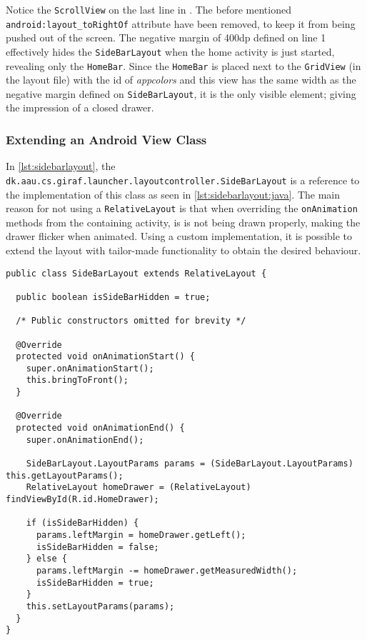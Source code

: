 Notice the \lstinline|ScrollView| on the last line in .
The before mentioned \lstinline{android:layout_toRightOf} attribute have been removed, to keep it from being pushed out of the screen.
The negative margin of 400dp defined on line 1 effectively hides the \lstinline|SideBarLayout| when the home activity is just started, revealing only the \lstinline|HomeBar|.
Since the \lstinline|HomeBar| is placed next to the \lstinline|GridView| (in the layout file) with the id of \textit{appcolors} and this view has the same width as the negative margin defined on \lstinline|SideBarLayout|, it is the only visible element; giving the impression of a closed drawer.

\subsubsection{Extending an Android View Class}\label{sec:siebarlayout:java}
In \cref{lst:sidebarlayout}, the \lstinline|dk.aau.cs.giraf.launcher.layoutcontroller.SideBarLayout| is a reference to the implementation of this class as seen in \cref{lst:sidebarlayout:java}.
The main reason for not using a \lstinline|RelativeLayout| is that when overriding the \lstinline|onAnimation| methods from the containing activity, is is not being drawn properly, making the drawer flicker when animated.
Using a custom implementation, it is possible to extend the layout with tailor-made functionality to obtain the desired behaviour.

\begin{lstlisting}[caption={Extending the Android \lstinline|RelativeLayout| class.},label={lst:sidebarlayout:java}]
public class SideBarLayout extends RelativeLayout {
  
  public boolean isSideBarHidden = true;
  
  /* Public constructors omitted for brevity */
  
  @Override
  protected void onAnimationStart() {
    super.onAnimationStart();
    this.bringToFront();
  }
  
  @Override
  protected void onAnimationEnd() {
    super.onAnimationEnd();

    SideBarLayout.LayoutParams params = (SideBarLayout.LayoutParams) this.getLayoutParams();
    RelativeLayout homeDrawer = (RelativeLayout) findViewById(R.id.HomeDrawer);

    if (isSideBarHidden) {
      params.leftMargin = homeDrawer.getLeft();
      isSideBarHidden = false;
    } else {
      params.leftMargin -= homeDrawer.getMeasuredWidth();
      isSideBarHidden = true;
    }
    this.setLayoutParams(params);
  }
}
\end{lstlisting}

